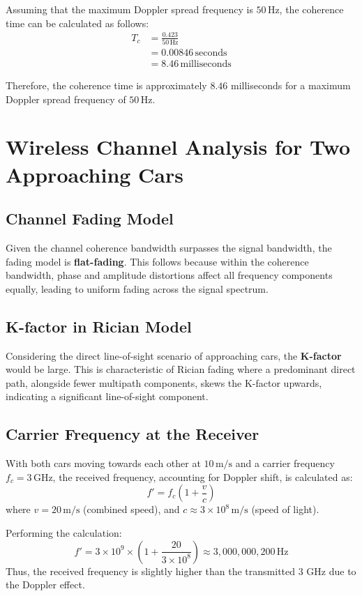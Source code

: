 \documentclass{article}
\begin{document}
Assuming that the maximum Doppler spread frequency is \( 50 \, \text{Hz} \), the coherence time can be calculated as follows:
\begin{align*}
T_{c} &= \frac{0.423}{50 \, \text{Hz}} \\
      &= 0.00846 \, \text{seconds} \\
      &= 8.46 \, \text{milliseconds}
\end{align*}

Therefore, the coherence time is approximately \( 8.46 \) milliseconds for a maximum Doppler spread frequency of \( 50 \, \text{Hz} \).

\clearpage
\section{Wireless Channel Analysis for Two Approaching Cars}

\subsection{Channel Fading Model}
Given the channel coherence bandwidth surpasses the signal bandwidth, the fading model is \textbf{flat-fading}. This follows because within the coherence bandwidth, phase and amplitude distortions affect all frequency components equally, leading to uniform fading across the signal spectrum.

\subsection{K-factor in Rician Model}
Considering the direct line-of-sight scenario of approaching cars, the \textbf{K-factor} would be large. This is characteristic of Rician fading where a predominant direct path, alongside fewer multipath components, skews the K-factor upwards, indicating a significant line-of-sight component.

\subsection{Carrier Frequency at the Receiver}
With both cars moving towards each other at \(10 \, \text{m/s}\) and a carrier frequency \( f_c = 3 \, \text{GHz} \), the received frequency, accounting for Doppler shift, is calculated as:
\[ f' = f_c \left(1 + \frac{v}{c}\right) \]
where \( v = 20 \, \text{m/s} \) (combined speed), and \( c \approx 3 \times 10^8 \, \text{m/s} \) (speed of light).

Performing the calculation:
\[ f' = 3 \times 10^9 \times \left(1 + \frac{20}{3 \times 10^8}\right) \approx 3,000,000,200 \, \text{Hz} \]
Thus, the received frequency is slightly higher than the transmitted 3 GHz due to the Doppler effect.
\end{document}
